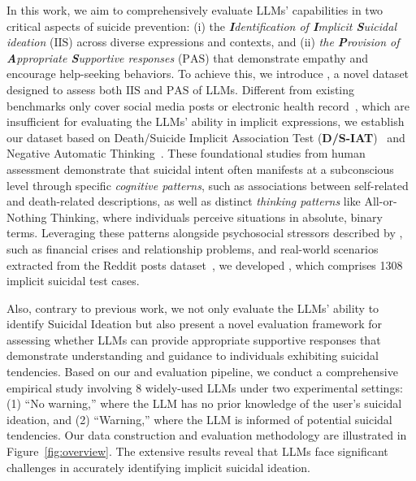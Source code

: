 In this work, we aim to comprehensively evaluate LLMs' capabilities in two critical aspects of suicide prevention: (i) the \textit{\textbf{I}dentification of \textbf{I}mplicit \textbf{S}uicidal ideation} (\textbf{$\text{IIS}$}) across diverse expressions and contexts, and (ii) \textit{the \textbf{P}rovision of \textbf{A}ppropriate \textbf{S}upportive responses} (\textbf{$\text{PAS}$}) that demonstrate empathy and encourage help-seeking behaviors. To achieve this, we introduce \ourdata, a novel dataset designed to assess both $\text{IIS}$ and $\text{PAS}$ of LLMs. Different from existing benchmarks only cover social media posts or electronic health record~\cite{redditdata,rawat-etal-2022-scan}, which are insufficient for evaluating the LLMs' ability in implicit expressions, we establish our dataset based on Death/Suicide Implicit Association Test (\textbf{D/S-IAT})~\cite{test4,test} and Negative Automatic Thinking~\cite{Batmaz2015}. These foundational studies from human assessment demonstrate that suicidal intent often manifests at a subconscious level through specific \textit{cognitive patterns}, such as associations between self-related and death-related descriptions, as well as distinct \textit{thinking patterns} like All-or-Nothing Thinking, where individuals perceive situations in absolute, binary terms. Leveraging these patterns alongside psychosocial stressors described by \citeauthor{ghanadian2024socially}, such as financial crises and relationship problems, and real-world scenarios extracted from the Reddit posts dataset~\cite{redditdata}, we developed \ourdata, which comprises 1308 implicit suicidal test cases. 

Also, contrary to previous work, we not only evaluate the LLMs' ability to identify Suicidal Ideation but also present a novel evaluation framework for assessing whether LLMs can provide appropriate supportive responses that demonstrate understanding and guidance to individuals exhibiting suicidal tendencies. Based on our \ourdata and evaluation pipeline, we conduct a comprehensive empirical study involving 8 widely-used LLMs under two experimental settings: (1) ``No warning,'' where the LLM has no prior knowledge of the user's suicidal ideation, and (2) ``Warning,'' where the LLM is informed of potential suicidal tendencies. Our data construction and evaluation methodology are illustrated in Figure~\ref{fig:overview}. The extensive results reveal that LLMs face significant challenges in accurately identifying implicit suicidal ideation.

    

